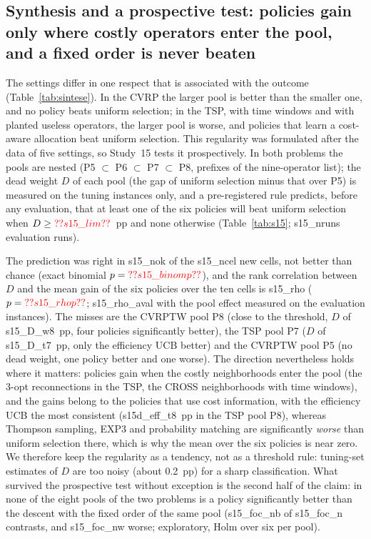 \subsection{Synthesis and a prospective test: policies gain only where costly operators enter the pool, and a fixed order is never beaten}\label{sec:r7}
The settings differ in one respect that is associated with the outcome (Table~\ref{tab:sintese}). In the CVRP the larger pool is better than the smaller one, and no policy beats uniform selection; in the TSP, with time windows and with planted useless operators, the larger pool is worse, and policies that learn a cost-aware allocation beat uniform selection. This regularity was formulated after the data of five settings, so Study~15 tests it prospectively. In both problems the pools are nested (P5 $\subset$ P6 $\subset$ P7 $\subset$ P8, prefixes of the nine-operator list); the dead weight $D$ of each pool (the gap of uniform selection minus that over P5) is measured on the tuning instances only, and a pre-registered rule predicts, before any evaluation, that at least one of the six policies will beat uniform selection when $D\ge\num{s15_lim}$~pp and none otherwise (Table~\ref{tab:s15}; \num{s15_nruns} evaluation runs).



The prediction was right in \num{s15_nok} of the \num{s15_ncel} new cells, not better than chance (exact binomial $p=\num{s15_binomp}$), and the rank correlation between $D$ and the mean gain of the six policies over the ten cells is \num{s15_rho} ($p=\num{s15_rhop}$; \num{s15_rho_aval} with the pool effect measured on the evaluation instances). The misses are the CVRPTW pool P8 (close to the threshold, $D$ of \num{s15_D_w8}~pp, four policies significantly better), the TSP pool P7 ($D$ of \num{s15_D_t7}~pp, only the efficiency UCB better) and the CVRPTW pool P5 (no dead weight, one policy better and one worse). The direction nevertheless holds where it matters: policies gain when the costly neighborhoods enter the pool (the 3-opt reconnections in the TSP, the CROSS neighborhoods with time windows), and the gains belong to the policies that use cost information, with the efficiency UCB the most consistent (\num{s15d_eff_t8}~pp in the TSP pool P8), whereas Thompson sampling, EXP3 and probability matching are significantly \emph{worse} than uniform selection there, which is why the mean over the six policies is near zero. We therefore keep the regularity as a tendency, not as a threshold rule: tuning-set estimates of $D$ are too noisy (about 0.2~pp) for a sharp classification. What survived the prospective test without exception is the second half of the claim: in none of the eight pools of the two problems is a policy significantly better than the descent with the fixed order of the same pool (\num{s15_foc_nb} of \num{s15_foc_n} contrasts, and \num{s15_foc_nw} worse; exploratory, Holm over six per pool).

